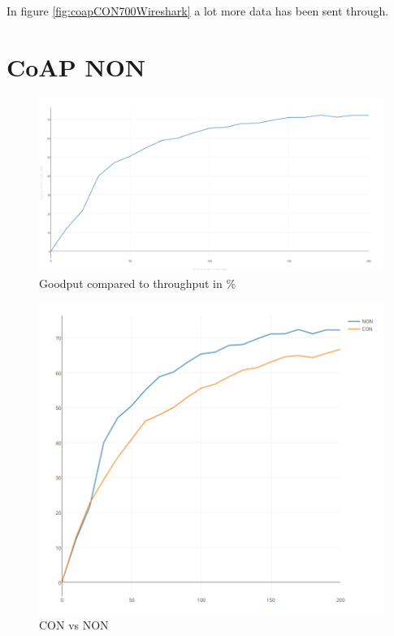 In figure \ref{fig:coapCON700Wireshark} a lot more data has been sent through. 



\section{CoAP NON}








\begin{figure}[ht]
    \centering
    \includegraphics[scale=0.25]{graph1.png}    
    \caption{Goodput compared to throughput in \%}
    \label{fig:goodputThroughputGraph}
\end{figure}



\begin{figure}[ht]
    \centering
    \includegraphics[scale=0.45]{CONvsNON1.png}    
    \caption{CON vs NON}
    \label{fig:CONvsNON}
\end{figure}


